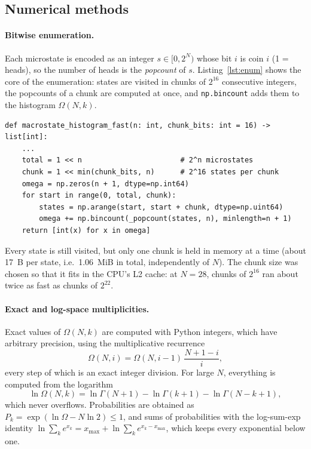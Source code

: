 \documentclass[11pt,a4paper]{article}
\begin{document}
\subsection{Numerical methods}
\label{sec:numerics}
\paragraph{Bitwise enumeration.} Each microstate is encoded as an integer
$s\in[0,2^N)$ whose bit $i$ is coin $i$ (1 = heads), so the number of heads is the
\emph{popcount} of $s$. Listing~\ref{lst:enum} shows the core of the enumeration: states are
visited in chunks of $2^{16}$ consecutive integers, the popcounts of a chunk are computed at once,
and \texttt{np.bincount} adds them to the histogram $\Omega(N,k)$.

\begin{lstlisting}[caption={Chunked bitwise enumeration (\texttt{src/microstates.py}).}, label={lst:enum}]
def macrostate_histogram_fast(n: int, chunk_bits: int = 16) -> list[int]:
    ...
    total = 1 << n                       # 2^n microstates
    chunk = 1 << min(chunk_bits, n)      # 2^16 states per chunk
    omega = np.zeros(n + 1, dtype=np.int64)
    for start in range(0, total, chunk):
        states = np.arange(start, start + chunk, dtype=np.uint64)
        omega += np.bincount(_popcount(states, n), minlength=n + 1)
    return [int(x) for x in omega]
\end{lstlisting}
Every state is still visited, but only one chunk is held in memory at a time
(about \SI{17}{B} per state, i.e.\ \SI{1.06}{MiB} in total, independently of $N$). The chunk
size was chosen so that it fits in the CPU's L2 cache: at $N=28$, chunks of $2^{16}$ ran about
twice as fast as chunks of $2^{22}$.

\paragraph{Exact and log-space multiplicities.} Exact values of $\Omega(N,k)$ are computed with
Python integers, which have arbitrary precision, using the multiplicative recurrence
\begin{equation*}
  \Omega(N,i)=\Omega(N,i-1)\,\frac{N+1-i}{i},
\end{equation*}
every step of which is an exact integer division.
For large $N$, everything is computed from the logarithm
\begin{equation}
  \ln\Omega(N,k)=\ln\Gamma(N+1)-\ln\Gamma(k+1)-\ln\Gamma(N-k+1),
  \label{eq:lgamma}
\end{equation}
which never overflows. Probabilities are obtained as $P_k=\exp(\ln\Omega-N\ln2)\le 1$, and
sums of probabilities with the log-sum-exp identity
$\ln\sum_k e^{x_k}=x_{\max}+\ln\sum_k e^{x_k-x_{\max}}$, which keeps every exponential
below one.
\end{document}
